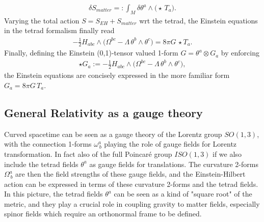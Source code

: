 \begin{align}
    \delta S_{matter}=:\int_M \delta\theta^a \wedge \big(\star\, T_a\big).
\end{align}
Varying the total action $S=S_{EH}+S_{matter}$ wrt the tetrad, the Einstein equations in the tetrad formalism finally read
\begin{align}
    -\tfrac12 H_{abc}\wedge \Big( \Omega^{bc} - \Lambda \,\theta^b \wedge \theta^c\Big) = 8\pi G\, \star T_a.
\end{align}
Finally, defining the Einstein (0,1)-tensor valued 1-form $G= \theta^a\otimes G_a$ by enforcing
\begin{align}
    \star G_a := -\tfrac12 H_{abc}\wedge \Big( \Omega^{bc} - \Lambda \,\theta^b \wedge \theta^c\Big),
\end{align}
the Einstein equations are concisely expressed in the more familiar form $G_a = 8\pi G\, T_a$.




\subsection{General Relativity as a gauge theory}
%
Curved spacetime can be seen as a gauge theory of the Lorentz group $SO(1,3)$, with the connection 1-forms $\omega^a_{\, b}$ playing the role of gauge fields for Lorentz transformation.
In fact also of the full Poincaré group $ISO(1,3)$ if we also include the tetrad fields $\theta^a$ as gauge fields for translations.
The curvature 2-forms $\Omega^a_{\, b}$ are then the field strengths of these gauge fields, and the Einstein-Hilbert action can be expressed in terms of these curvature 2-forms and the tetrad fields.
In this picture, the tetrad fields $\theta^a$ can be seen as a kind of "square root" of the metric, and they play a crucial role in coupling gravity to matter fields, especially spinor fields which require an orthonormal frame to be defined.

